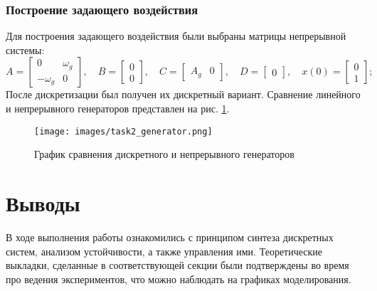 \documentclass[a4paper, 14pt]{extarticle}
\theoremstyle{definition}
\theoremstyle{plain}
\theoremstyle{remark}
\begin{document}
\subsubsection{Построение задающего воздействия}
Для построения задающего воздействия были выбраны матрицы непрерывной системы:
\[
	A = \begin{bmatrix} 0 & \omega_g \\ -\omega_g & 0 \end{bmatrix}, \quad
	B = \begin{bmatrix} 0 \\ 0 \end{bmatrix}, \quad
	C = \begin{bmatrix} A_g & 0 \end{bmatrix}, \quad
	D = \begin{bmatrix} 0 \end{bmatrix}, \quad
	x(0) = \begin{bmatrix} 0 \\ 1 \end{bmatrix};
\]
После дискретизации был получен их дискретный вариант. Сравнение линейного и непрерывного генераторов представлен на рис. \ref{fig:task2_gen}.
\begin{figure}
	[H]
	\centering
	\texttt{[image: images/task2\_generator.png]}
	\caption{График сравнения дискретного и непрерывного генераторов}
	\label{fig:task2_gen}
\end{figure}


\newpage
\section{Выводы}
В ходе выполнения работы ознакомились с принципом синтеза дискретных систем, анализом устойчивости, а также управления ими. Теоретические выкладки, сделанные в соответствующей секции были подтверждены во время про ведения экспериментов, что можно наблюдать на графиках моделирования.
\end{document}
